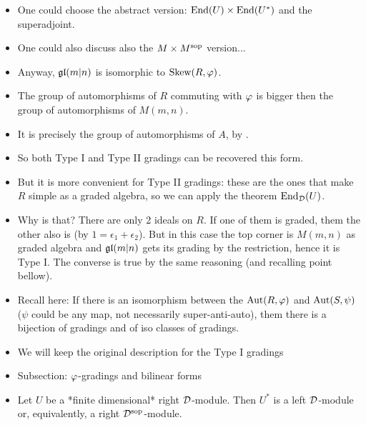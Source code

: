 \documentclass{amsbook}
\newcommand{\cmark}{\ding{51}}%
\newcommand{\xmark}{\ding{55}}%
\newcommand{\done}{\rlap{\raisebox{1pt}{\large\hspace{-5pt}\cmark}}}
\newcommand{\cancel}{\rlap{\raisebox{0pt}{\large\hspace{-5pt}\xmark}}}
\begin{document}
\begin{itemize}
        \item[\cancel] One could choose the abstract version: $\operatorname{End} (U) \times \operatorname{End}(U^*)$ and the superadjoint.
        
        \item[\done] One could also discuss also the $M \times M^{\mathrm{sop}}$ version...
        
        \item[\done] Anyway, $\mathfrak{gl}(m|n)$ is isomorphic to $\operatorname{Skew} (R, \varphi)$.
        
        \item The group of automorphisms of $R$ commuting with $\varphi$ is bigger then the group of automorphisms of $M(m,n)$.
        
        \item It is precisely the group of automorphisms of $A$, by \cite{serganova}.
        
        \item[\done] So both Type I and Type II gradings can be recovered this form.
        
        \item[\done] But it is more convenient for Type II gradings: these are the ones that make $R$ simple as a graded algebra, so we can apply the theorem $\operatorname{End}_{\mathcal{D}} (U)$.
        
        \item[\done] Why is that? There are only 2 ideals on $R$. If one of them is graded, them the other also is (by $1 =  \epsilon_1 + \epsilon_2$). But in this case the top corner is $M(m,n)$ as graded algebra and $\mathfrak{gl}(m|n)$ gets its grading by the restriction, hence it is Type I. The converse is true by the same reasoning (and recalling point bellow).
        
        \item[\done] Recall here: If there is an isomorphism between the $\operatorname{Aut}(R, \varphi)$ and $\operatorname{Aut}(S, \psi)$ ($\psi$ could be any map, not necessarily super-anti-auto), them there is a bijection of gradings and of iso classes of gradings.
        
        \item[\done] We will keep the original description for the Type I gradings
        
        \newpage
        
        \item[\done] Subsection: $\varphi$-gradings and bilinear forms
        
        \item[\done] Let $U$ be a *finite dimensional* right $\mathcal{D}$-module. Then $U^*$ is a left $\mathcal{D}$-module or, equivalently, a right $\mathcal{D}^{\mathrm{sop}}$-module.
        

\end{itemize}
\end{document}
